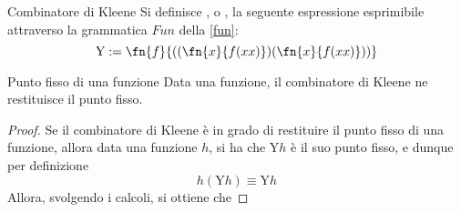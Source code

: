 \documentclass[a4paper, 12pt]{report}
\begin{document}
    \begin{frameddefn}{Combinatore di Kleene}
        Si definisce , o , la seguente espressione esprimibile attraverso la grammatica $Fun$ della \cref{fun}: $$\mathrm Y := \fn{f}{((\fn{x}{f(xx)})(\fn{x}{f(xx)}))}$$
    \end{frameddefn}

    \begin{framedprop}{Punto fisso di una funzione}
        Data una funzione, il combinatore di Kleene ne restituisce il punto fisso.
    \end{framedprop}

    \begin{proof}
        Se il combinatore di Kleene è in grado di restituire il punto fisso di una funzione, allora data una funzione $h$, si ha che $\mathrm Yh$ è il suo punto fisso, e dunque per definizione $$h(\mathrm Yh) \equiv \mathrm Yh$$ Allora, svolgendo i calcoli, si ottiene che 
    \end{proof}
\end{document}
